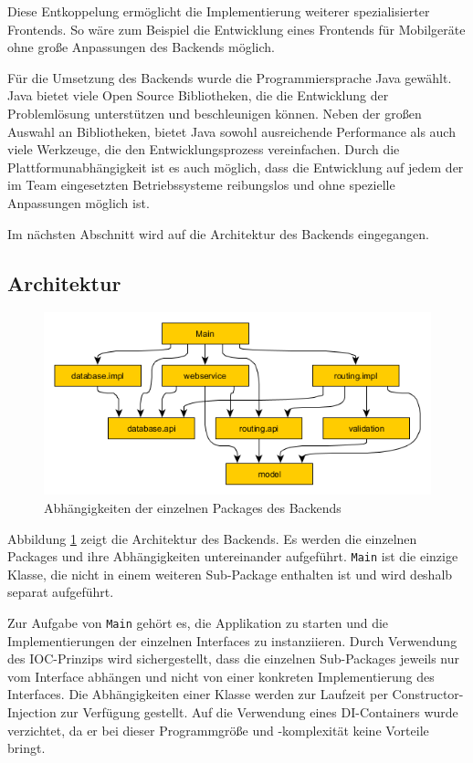 \documentclass[
ngerman          %
,a4paper          %
,11pt
,pdftex
]{report}
\begin{document}
Diese Entkoppelung ermöglicht die Implementierung weiterer spezialisierter Frontends. So wäre zum Beispiel die Entwicklung eines Frontends für Mobilgeräte ohne große Anpassungen des Backends möglich.

Für die Umsetzung des Backends wurde die Programmiersprache Java gewählt. Java bietet viele Open Source Bibliotheken, die die Entwicklung der Problemlösung unterstützen und beschleunigen können. Neben der großen Auswahl an Bibliotheken, bietet Java sowohl ausreichende Performance als auch viele Werkzeuge, die den Entwicklungsprozess vereinfachen. Durch die Plattformunabhängigkeit ist es auch möglich, dass die Entwicklung auf jedem der im Team eingesetzten Betriebssysteme reibungslos und ohne spezielle Anpassungen möglich ist.

Im nächsten Abschnitt wird auf die Architektur des Backends eingegangen.

\subsection{Architektur}

\begin{figure}
\centering
\includegraphics[width=1\linewidth]{architecture.png}
\caption{Abhängigkeiten der einzelnen Packages des Backends}
\label{fig:arch}
\end{figure}

Abbildung \ref{fig:arch} zeigt die Architektur des Backends. Es werden die einzelnen Packages und ihre Abhängigkeiten untereinander aufgeführt. \texttt{Main} ist die einzige Klasse, die nicht in einem weiteren Sub-Package enthalten ist und wird deshalb separat aufgeführt.

Zur Aufgabe von \texttt{Main} gehört es, die Applikation zu starten und die Implementierungen der einzelnen Interfaces zu instanziieren. Durch Verwendung des \ac{IOC}-Prinzips wird sichergestellt, dass die einzelnen Sub-Packages jeweils nur vom Interface abhängen und nicht von einer konkreten Implementierung des Interfaces. Die Abhängigkeiten einer Klasse werden zur Laufzeit per Constructor-Injection zur Verfügung gestellt. Auf die Verwendung eines \ac{DI}-Containers wurde verzichtet, da er bei dieser Programmgröße und -komplexität keine Vorteile bringt.
\end{document}
